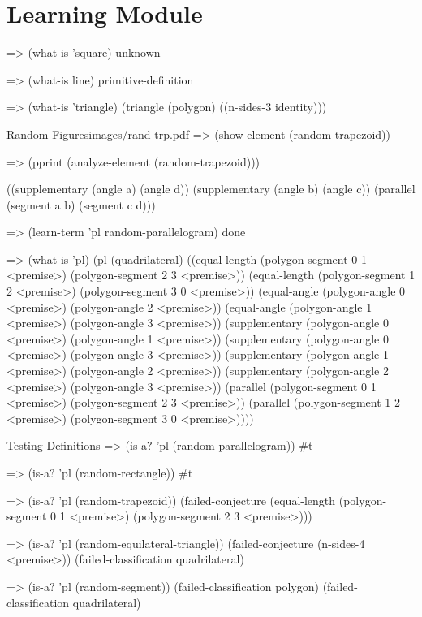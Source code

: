 \section{Learning Module}

\begin{repl-example}
=> (what-is 'square)
unknown

=> (what-is line)
primitive-definition

=> (what-is 'triangle)
(triangle (polygon)
          ((n-sides-3 identity)))
\end{repl-example}

\begin{pdf-example}
[comment style={frame hidden,opacityback=0,
raster columns=3,graphics pages={1,2,3}}]
{Random Figures}{images/rand-trp.pdf}
=> (show-element (random-trapezoid))
\end{pdf-example}

\begin{repl-example}
=> (pprint (analyze-element (random-trapezoid)))

((supplementary (angle a) (angle d))
 (supplementary (angle b) (angle c))
 (parallel (segment a b) (segment c d)))
\end{repl-example}

\begin{repl-example}
=> (learn-term 'pl random-parallelogram)
done

=> (what-is 'pl)
(pl
 (quadrilateral)
 ((equal-length (polygon-segment 0 1 <premise>)
                (polygon-segment 2 3 <premise>))
  (equal-length (polygon-segment 1 2 <premise>)
                (polygon-segment 3 0 <premise>))
  (equal-angle (polygon-angle 0 <premise>)
               (polygon-angle 2 <premise>))
  (equal-angle (polygon-angle 1 <premise>)
               (polygon-angle 3 <premise>))
  (supplementary (polygon-angle 0 <premise>)
                 (polygon-angle 1 <premise>))
  (supplementary (polygon-angle 0 <premise>)
                 (polygon-angle 3 <premise>))
  (supplementary (polygon-angle 1 <premise>)
                 (polygon-angle 2 <premise>))
  (supplementary (polygon-angle 2 <premise>)
                 (polygon-angle 3 <premise>))
  (parallel (polygon-segment 0 1 <premise>)
            (polygon-segment 2 3 <premise>))
  (parallel (polygon-segment 1 2 <premise>)
            (polygon-segment 3 0 <premise>))))
\end{repl-example}

\begin{repl-example}{Testing Definitions}
=> (is-a? 'pl (random-parallelogram))
#t

=> (is-a? 'pl (random-rectangle))
#t

=> (is-a? 'pl (random-trapezoid))
(failed-conjecture
 (equal-length (polygon-segment 0 1 <premise>)
               (polygon-segment 2 3 <premise>)))

=> (is-a? 'pl (random-equilateral-triangle))
(failed-conjecture (n-sides-4 <premise>))
(failed-classification quadrilateral)

=> (is-a? 'pl (random-segment))
(failed-classification polygon)
(failed-classification quadrilateral)
\end{repl-example}


